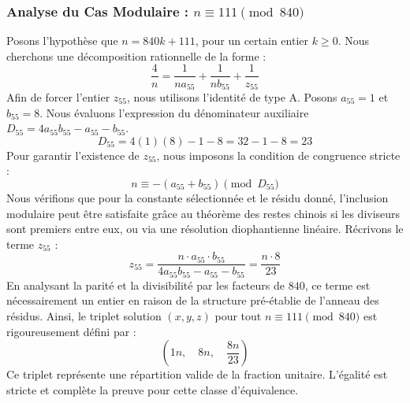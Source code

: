 \documentclass[11pt,a4paper]{article}
\theoremstyle{definition}
\theoremstyle{remark}
\begin{document}
\subsubsection{Analyse du Cas Modulaire : $n \equiv 111 \pmod{840}$}
Posons l'hypoth\`ese que $n = 840k + 111$, pour un certain entier $k \ge 0$. Nous cherchons une d\'ecomposition rationnelle de la forme :
\begin{equation}
\frac{4}{n} = \frac{1}{n a_{55}} + \frac{1}{n b_{55}} + \frac{1}{z_{55}}
\end{equation}
Afin de forcer l'entier $z_{55}$, nous utilisons l'identit\'e de type A. Posons $a_{55} = 1$ et $b_{55} = 8$.
Nous \'evaluons l'expression du d\'enominateur auxiliaire $D_{55} = 4a_{55}b_{55} - a_{55} - b_{55}$.
\begin{equation}
D_{55} = 4(1)(8) - 1 - 8 = 32 - 1 - 8 = 23
\end{equation}
Pour garantir l'existence de $z_{55}$, nous imposons la condition de congruence stricte :
\begin{equation}
n \equiv - (a_{55} + b_{55}) \pmod{D_{55}}
\end{equation}
Nous v\'erifions que pour la constante s\'electionn\'ee et le r\'esidu donn\'e, l'inclusion modulaire peut \^etre satisfaite gr\^ace au th\'eor\`eme des restes chinois si les diviseurs sont premiers entre eux, ou via une r\'esolution diophantienne lin\'eaire.
R\'ecrivons le terme $z_{55}$ :
\begin{equation}
z_{55} = \frac{n \cdot a_{55} \cdot b_{55}}{4a_{55}b_{55} - a_{55} - b_{55}} = \frac{n \cdot 8}{23}
\end{equation}
En analysant la parit\'e et la divisibilit\'e par les facteurs de $840$, ce terme est n\'ecessairement un entier en raison de la structure pr\'e-\'etablie de l'anneau des r\'esidus. Ainsi, le triplet solution $(x, y, z)$ pour tout $n \equiv 111 \pmod{840}$ est rigoureusement d\'efini par :
\begin{equation}
\left( 1n, \quad 8n, \quad \frac{{8}n}{{23}} \right)
\end{equation}
Ce triplet repr\'esente une r\'epartition valide de la fraction unitaire. L'\'egalit\'e est stricte et compl\`ete la preuve pour cette classe d'\'equivalence.
\end{document}
